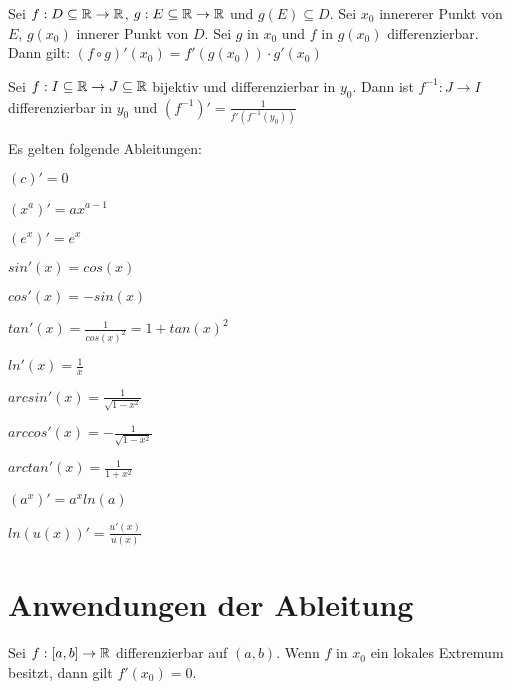 \begin{satz}[Kettenregel]
	Sei $f :  D \subseteq \mathbb{R} \rightarrow \mathbb{R}$, $g : E \subseteq \mathbb{R} \rightarrow \mathbb{R}$ und $g(E) \subseteq D$. Sei $x_0$ innererer Punkt von $E$, $g(x_0)$ innerer Punkt von $D$. Sei $g$ in $x_0$ und $f$ in $g(x_0)$ differenzierbar. Dann gilt: $(f \circ g)'(x_0) = f'(g(x_0)) \cdot g'(x_0)$
 \end{satz}

\begin{satz}
	Sei $f : I \subseteq \mathbb{R} \rightarrow J \subseteq \mathbb{R} $ bijektiv und differenzierbar in $y_0$. Dann ist $f^{-1} : J \rightarrow I$ differenzierbar in $y_0$ und $(f^{-1})'=\frac{1}{f'(f^{-1}(y_0))}$
\end{satz}

\begin{satz}
	Es gelten folgende Ableitungen:
	\begin{multicols}{2}
		\begin{description}[noitemsep]
			\item $(c)' = 0$
			\item $(x^a)'=ax^{a-1}$
			\item $(e^x)'=e^x$
			\item $sin'(x) = cos(x)$
			\item $cos'(x) = -sin(x)$
			\item $tan'(x) = \frac{1}{cos(x)^2} = 1 + tan(x)^2$
			\item $ln'(x) = \frac{1}{x}$
			\item $arcsin'(x) = \frac{1}{\sqrt{1 -x^2}}$	
			\item $arccos'(x) = - \frac{1}{\sqrt{1 - x^2}}$	
			\item $arctan'(x) = \frac{1}{1 + x^2}$
			\item $(a^x)' = a^x ln(a)$
			\item $ln(u(x))'=\frac{u'(x)}{u(x)}$
		\end{description}
	\end{multicols}
\end{satz}

\section{Anwendungen der Ableitung}

\begin{satz}
	Sei $f : [a,b] \rightarrow \mathbb{R}$ differenzierbar auf $(a,b)$. Wenn $f$ in $x_0$ ein lokales Extremum besitzt, dann gilt $f'(x_0) = 0$.
\end{satz}

